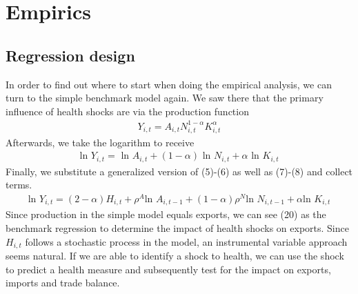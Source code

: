 \documentclass{article}
\begin{document}
\section{Empirics}

\subsection{Regression design}

In order to find out where to start when doing the empirical analysis, we can turn to the simple benchmark model again. We saw there that the primary influence of health shocks are via the production function
\begin{align*}
Y_{i, t} = A_{i, t} N_{i, t}^{1 - \alpha} K_{i, t}^{\alpha}
\end{align*}
Afterwards, we take the logarithm to receive
\begin{align*}
\text{ln } Y_{i, t} = \text{ ln } A_{i, t} + (1 - \alpha) \text{ ln } N_{i, t} + \alpha \text{ ln } K_{i, t}
\end{align*}
Finally, we substitute a generalized version of (5)-(6) as well as (7)-(8) and collect terms.
\begin{align}
\text{ln } Y_{i, t} = (2 - \alpha)H_{i, t} + \rho^A \text{ln } A_{i, t-1} + (1 - \alpha) \rho^N \text{ln } N_{i, t-1} + \alpha \text{ln } K_{i, t}
\end{align}
Since production in the simple model equals exports, we can see (20) as the benchmark regression to determine the impact of health shocks on exports. Since $H_{i, t}$ follows a stochastic process in the model, an instrumental variable approach seems natural. If we are able to identify a shock to health, we can use the shock to predict a health measure and subsequently test for the impact on exports, imports and trade balance. \\
\end{document}
